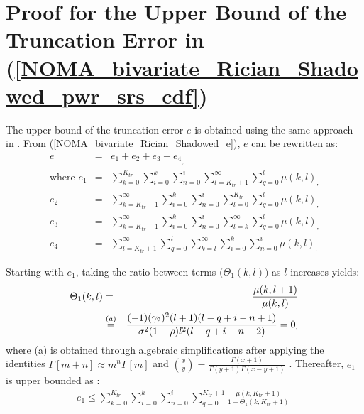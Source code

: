 \section{Proof for the Upper Bound of the Truncation Error in (\ref{NOMA_bivariate_Rician_Shadowed_pwr_srs_cdf})} \label{NOMA_bivariate_Rician_Shadowed_lemma_e_upper_proof}
The upper bound of the truncation error $e$ is obtained using the same approach in \cite{o2011product}. From (\ref{NOMA_bivariate_Rician_Shadowed_e}), $e$ can be rewritten as: 
\begin{eqnarray}
e & = & e_1 + e_2 + e_3 + {e_4}_, \label{NOMA_bivariate_Rician_Shadowed_lemma_e_upper_proof_eq1} \\
\text{where }e_1 & = & \sum_{k=0}^{K_{tr}} \sum_{i=0}^{k} \sum_{n=0}^{i} \sum_{l=K_{tr}+1}^{\infty} \sum_{q=0}^{l} \mu(k,l)_, \nonumber \\
	e_2 & = & \sum_{k=K_{tr}+1}^{\infty} \sum_{i=0}^{k} \sum_{n=0}^{i} \sum_{l=0}^{K_{tr}} \sum_{q=0}^{l} \mu(k,l)_, \nonumber \\
	e_3 & = & \sum_{k=K_{tr}+1}^{\infty} \sum_{i=0}^{k} \sum_{n=0}^{i} \sum_{l=k}^{\infty} \sum_{q=0}^{l} \mu(k,l)_, \nonumber \\
	e_4 & = & \sum_{l=K_{tr}+1}^{\infty} \sum_{q=0}^{l} \sum_{k=l}^{\infty} \sum_{i=0}^{k} \sum_{n=0}^{i} \mu(k,l)_. \nonumber
\end{eqnarray}

Starting with $e_1$, taking the ratio between terms $\big(\Theta_1(k,l)\big)$ as $l$ increases yields: 
\begin{eqnarray}
\Theta_1(k,l) & = & \frac{\mu(k,l+1)}{\mu(k,l)} \nonumber \\
 & \stackrel{(a)}{=} & \frac{(-1) (\gamma_2)^2 (l+1) (l-q+i-n+1)}{\sigma^2(1-\rho) l^2 (l-q+i-n+2)} = 0_,
\end{eqnarray}
where (a) is obtained through algebraic simplifications after applying the identities $\Gamma[m+n] \approx m^n\Gamma[m]$ \cite[eq. (25)]{rached2017unified} and $\binom{x}{y} = \frac{\Gamma(x+1)}{\Gamma(y+1)\Gamma(x-y+1)}$ \cite[eq. (3.1.2)]{abramowitz1964handbook}. Thereafter, $e_1$ is upper bounded as \cite[eq. (89)]{o2011product}:
\begin{eqnarray} 
e_1 \leq \sum_{k=0}^{K_{tr}} \sum_{i=0}^{k} \sum_{n=0}^{i} \sum_{q=0}^{K_{tr}+1} {\frac{\mu(k,K_{tr}+1)}{1-\Theta_1(k,K_{tr}+1)}}_. \label{NOMA_bivariate_Rician_Shadowed_lemma_e_upper_proof_eq2}
\end{eqnarray}

